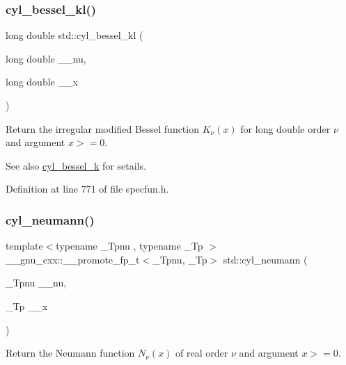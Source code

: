 \subsubsection{\texorpdfstring{cyl\+\_\+bessel\+\_\+kl()}{cyl\_bessel\_kl()}}
{\footnotesize\ttfamily long double std\+::cyl\+\_\+bessel\+\_\+kl (\begin{DoxyParamCaption}\item[{long double}]{\+\_\+\+\_\+nu,  }\item[{long double}]{\+\_\+\+\_\+x }\end{DoxyParamCaption})\hspace{0.3cm}{\ttfamily [inline]}}

Return the irregular modified Bessel function $ K_{\nu}(x) $ for {\ttfamily long double} order $ \nu $ and argument $ x >= 0 $.

\begin{DoxySeeAlso}{See also}
\hyperlink{group__tr29124__math__spec__func_ga3cd72edf8e8ef6f225d9c4a067f9423e}{cyl\+\_\+bessel\+\_\+k} for setails. 
\end{DoxySeeAlso}


Definition at line 771 of file specfun.\+h.

\mbox{\label{group__tr29124__math__spec__func_gaa5720700a9d1c33f30b53c6b30ec3260}} 
\subsubsection{\texorpdfstring{cyl\+\_\+neumann()}{cyl\_neumann()}}
{\footnotesize\ttfamily template$<$typename \+\_\+\+Tpnu , typename \+\_\+\+Tp $>$ \\
\+\_\+\+\_\+gnu\+\_\+cxx\+::\+\_\+\+\_\+promote\+\_\+fp\+\_\+t$<$\+\_\+\+Tpnu, \+\_\+\+Tp$>$ std\+::cyl\+\_\+neumann (\begin{DoxyParamCaption}\item[{\+\_\+\+Tpnu}]{\+\_\+\+\_\+nu,  }\item[{\+\_\+\+Tp}]{\+\_\+\+\_\+x }\end{DoxyParamCaption})\hspace{0.3cm}{\ttfamily [inline]}}

Return the Neumann function $ N_{\nu}(x) $ of real order $ \nu $ and argument $ x >= 0 $.

